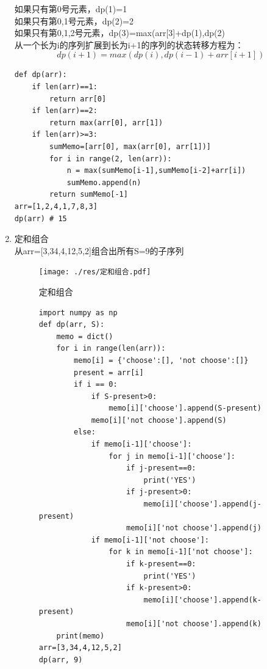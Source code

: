 \documentclass{book}
\begin{document}
\begin{enumerate}
\noindent 如果只有第0号元素，dp(1)=1\\
如果只有第0,1号元素，dp(2)=2\\
如果只有第0,1,2号元素，dp(3)=max(arr[3]+dp(1),dp(2)\\

\setlength{\parindent}{2em} 从一个长为i的序列扩展到长为i+1的序列的状态转移方程为：\\
$$dp(i+1)=max(dp(i),dp(i-1)+arr[i+1])$$
\begin{lstlisting} 
def dp(arr):
    if len(arr)==1:
        return arr[0]
    if len(arr)==2:
        return max(arr[0], arr[1])
    if len(arr)>=3:
        sumMemo=[arr[0], max(arr[0], arr[1])]
        for i in range(2, len(arr)):
            n = max(sumMemo[i-1],sumMemo[i-2]+arr[i])
            sumMemo.append(n)
        return sumMemo[-1]
arr=[1,2,4,1,7,8,3]
dp(arr) # 15
\end{lstlisting}   
\item 定和组合\\
从arr=[3,34,4,12,5,2]组合出所有S=9的子序列\\
\begin{figure}[!htbp]
\caption{定和组合}
\texttt{[image: ./res/定和组合.pdf]}
\centering
\end{figure}

\begin{figure}[!htbp]
\begin{lstlisting}
import numpy as np 
def dp(arr, S): 
    memo = dict() 
    for i in range(len(arr)): 
        memo[i] = {'choose':[], 'not choose':[]} 
        present = arr[i] 
        if i == 0: 
            if S-present>0: 
                memo[i]['choose'].append(S-present) 
            memo[i]['not choose'].append(S) 
        else: 
            if memo[i-1]['choose']: 
                for j in memo[i-1]['choose']: 
                    if j-present==0: 
                        print('YES') 
                    if j-present>0: 
                        memo[i]['choose'].append(j-present) 
                    memo[i]['not choose'].append(j) 
            if memo[i-1]['not choose']: 
                for k in memo[i-1]['not choose']: 
                    if k-present==0: 
                        print('YES')  
                    if k-present>0: 
                        memo[i]['choose'].append(k-present)  
                    memo[i]['not choose'].append(k)   
    print(memo) 
arr=[3,34,4,12,5,2] 
dp(arr, 9)
\end{lstlisting} 
\end{figure}
\end{enumerate}
\end{document}
